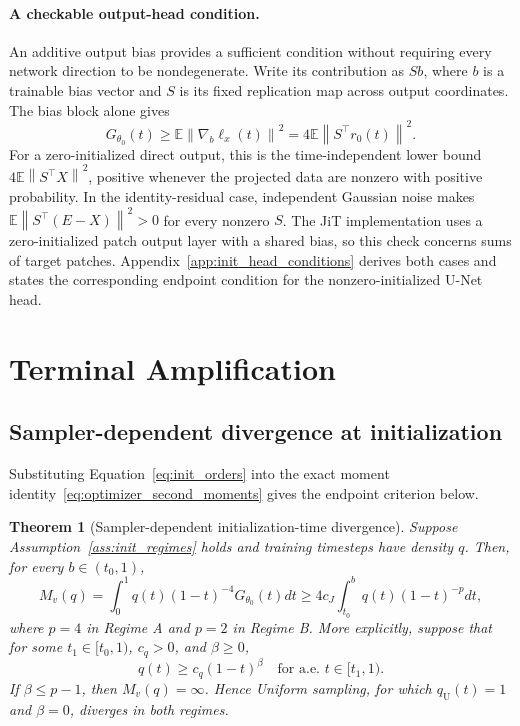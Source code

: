 \documentclass{article}
\theoremstyle{plain}
\newtheorem{theorem}{Theorem}[section]
\theoremstyle{definition}
\theoremstyle{remark}
\newcommand{\Ex}{\mathbb{E}}
\newcommand{\norm}[1]{\left\lVert #1\right\rVert}
\begin{document}
\paragraph{A checkable output-head condition.}
An additive output bias provides a sufficient condition without requiring every network direction to be nondegenerate. Write its contribution as $Sb$, where $b$ is a trainable bias vector and $S$ is its fixed replication map across output coordinates. The bias block alone gives
\begin{equation}
G_{\theta_0}(t)\ge\Ex\norm{\nabla_b\ell_x(t)}^2
=4\Ex\norm{S^\top r_0(t)}^2.
\label{eq:bias_certificate}
\end{equation}
For a zero-initialized direct output, this is the time-independent lower bound $4\Ex\norm{S^\top X}^2$, positive whenever the projected data are nonzero with positive probability. In the identity-residual case, independent Gaussian noise makes $\Ex\norm{S^\top(E-X)}^2>0$ for every nonzero $S$. The JiT implementation uses a zero-initialized patch output layer with a shared bias, so this check concerns sums of target patches. Appendix~\ref{app:init_head_conditions} derives both cases and states the corresponding endpoint condition for the nonzero-initialized U-Net head.

\section{Terminal Amplification}
\label{sec:theory}

\subsection{Sampler-dependent divergence at initialization}
\label{sec:init_divergence}

Substituting Equation~\eqref{eq:init_orders} into the exact moment identity~\eqref{eq:optimizer_second_moments} gives the endpoint criterion below.

\begin{theorem}[Sampler-dependent initialization-time divergence]
\label{thm:init_divergence}
Suppose Assumption~\ref{ass:init_regimes} holds and training timesteps have density $q$. Then, for every $b\in(t_0,1)$,
\begin{equation}
M_v(q)
=\int_0^1q(t)(1-t)^{-4}G_{\theta_0}(t)dt
\ge4c_J\int_{t_0}^{b}q(t)(1-t)^{-p}dt,
\label{eq:init_gradient_orders}
\end{equation}
where $p=4$ in Regime A and $p=2$ in Regime B. More explicitly, suppose that for some $t_1\in[t_0,1)$, $c_q>0$, and $\beta\ge0$,
\begin{equation}
q(t)\ge c_q(1-t)^\beta
\quad\text{for a.e. }t\in[t_1,1).
\label{eq:sampler_endpoint_lower_bound}
\end{equation}
If $\beta\le p-1$, then $M_v(q)=\infty$. Hence Uniform sampling, for which $q_{\mathrm U}(t)=1$ and $\beta=0$, diverges in both regimes.
\end{theorem}
\end{document}
